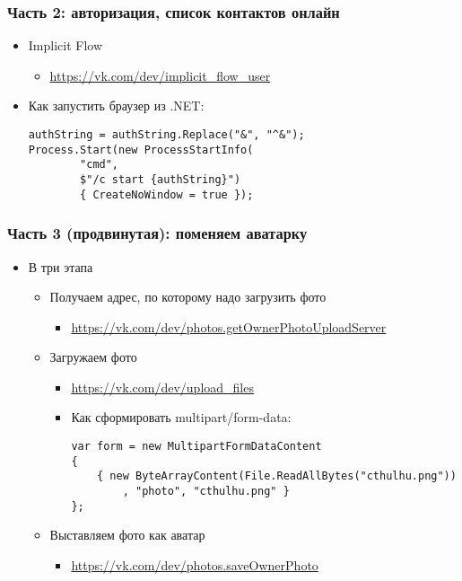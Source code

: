 \documentclass{../../slides-style}
\begin{document}
    \begin{frame}[fragile]
        \frametitle{Часть 2: авторизация, список контактов онлайн}
        \begin{itemize}
            \item Implicit Flow
            \begin{itemize}
                \item \url{https://vk.com/dev/implicit_flow_user}
            \end{itemize}
            \item Как запустить браузер из .NET:
            \begin{verbatim}
authString = authString.Replace("&", "^&");
Process.Start(new ProcessStartInfo(
        "cmd", 
        $"/c start {authString}") 
        { CreateNoWindow = true });
            \end{verbatim}
        \end{itemize}
    \end{frame}

    \begin{frame}[fragile]
        \frametitle{Часть 3 (продвинутая): поменяем аватарку}
        \begin{itemize}
            \item В три этапа
            \begin{itemize}
                \item Получаем адрес, по которому надо загрузить фото 
                \begin{itemize}
                    \item \url{https://vk.com/dev/photos.getOwnerPhotoUploadServer}
                \end{itemize}
                \item Загружаем фото
                \begin{itemize}
                    \item \url{https://vk.com/dev/upload_files}
                    \item Как сформировать multipart/form-data:
                    \begin{verbatim}
var form = new MultipartFormDataContent
{
    { new ByteArrayContent(File.ReadAllBytes("cthulhu.png"))
        , "photo", "cthulhu.png" }
};
                    \end{verbatim}
                \end{itemize}
                \item Выставляем фото как аватар
                \begin{itemize}
                    \item \url{https://vk.com/dev/photos.saveOwnerPhoto}
                \end{itemize}
            \end{itemize}
        \end{itemize}
    \end{frame}
\end{document}
